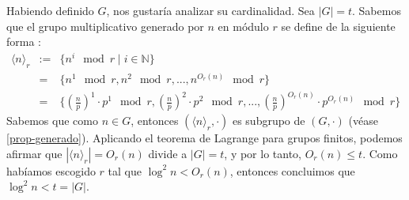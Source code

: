 \documentclass[10pt]{article}
\newcommand{\0}{\mathbf{0}}
\newcommand{\1}{\mathbf{1}}
\newcommand{\modl}{\mod}
\newcommand{\+}{\oplus}
\newcommand{\comentario}[1]{}
\theoremstyle{remark}
\theoremstyle{remark}
\newcommand{\tq}{\mid}
\begin{document}
	Habiendo definido $G$, nos gustaría analizar su cardinalidad. Sea $|G| = t$. Sabemos que el grupo multiplicativo generado por $n$ en módulo $r$ se define de la siguiente forma \comentario{citar apendice?}:
	\begin{eqnarray}
		\langle n\rangle _r &:=& \{n^i\modl r \tq i\in \mathbb{N}\}\nonumber\\
		&=&\{n^1\modl r,n^2\modl r,...,n^{O_r(n)}\modl r \}\nonumber\\
		&=&\{(\frac{n}{p})^1\cdot p^1\modl r,(\frac{n}{p})^2\cdot p^2\modl r,...,(\frac{n}{p})^{O_r(n)}\cdot p^{O_r(n)}\modl r \}\nonumber
	\end{eqnarray}
Sabemos que como $n\in G$, entonces $(\langle n\rangle_r,\cdot)$ es subgrupo de $(G,\cdot)$	(véase \ref{prop-generado}).
	Aplicando el teorema de Lagrange para grupos finitos, podemos afirmar que $|\langle n\rangle _r| = O_r(n)$ divide a $|G|=t$, y por lo tanto, $O_r(n)\leq t$. Como habí­amos escogido $r$ tal que $\log ^2n <O_r(n)$, entonces concluimos que $\log ^2 n <t=|G|$.
\end{document}
